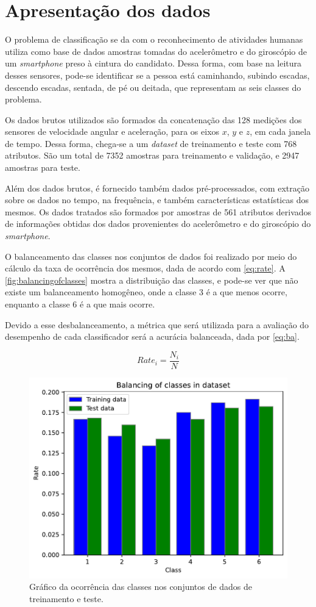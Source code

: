 
\section{Apresentação dos dados}

O problema de classificação se da com o reconhecimento de atividades humanas utiliza como base de dados amostras tomadas do acelerômetro e do giroscópio de um \textit{smartphone} preso à cintura do candidato. Dessa forma, com base na leitura desses sensores, pode-se identificar se a pessoa está caminhando, subindo escadas, descendo escadas, sentada, de pé ou deitada, que representam as seis classes do problema.

Os dados brutos utilizados são formados da concatenação das 128 medições dos sensores de velocidade angular e aceleração, para os eixos $x$, $y$ e $z$, em cada janela de tempo. Dessa forma, chega-se a um \textit{dataset} de treinamento e teste com 768 atributos. São um total de 7352 amostras para treinamento e validação, e 2947 amostras para teste.

Além dos dados brutos, é fornecido também dados pré-processados, com extração sobre os dados no tempo, na frequência, e também características estatísticas dos mesmos. Os dados tratados são formados por amostras de 561 atributos derivados de informações obtidas dos dados provenientes do acelerômetro e do giroscópio do \textit{smartphone}. 

O balanceamento das classes nos conjuntos de dados foi realizado por meio do cálculo da taxa de ocorrência dos mesmos, dada de acordo com \eqref{eq:rate}. A \autoref{fig:balancingofclasses} mostra a distribuição das classes, e pode-se ver que não existe um balanceamento homogêneo, onde a classe 3 é a que menos ocorre, enquanto a classe  6 é a que mais ocorre.

Devido a esse desbalanceamento, a métrica que será utilizada para a avaliação do desempenho de cada classificador será a acurácia balanceada, dada por \eqref{eq:ba}.

\begin{equation}\label{eq:rate}
	Rate_i = \frac{N_i}{N}
\end{equation}

\begin{figure}[H]
	\centering
	\includegraphics[width=0.55\linewidth]{../../plot/Balancing_of_classes}
	\caption{Gráfico da ocorrência das classes nos conjuntos de dados de treinamento e teste.}
	\label{fig:balancingofclasses}
\end{figure}

